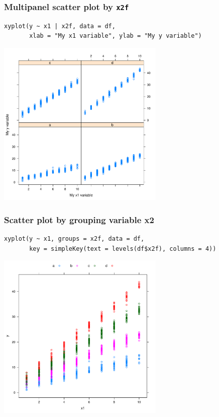 \documentclass[bigger]{beamer}
\begin{document}
\begin{frame}[fragile]
\frametitle{Multipanel scatter plot by \texttt{x2f}}
\label{sec-2_7}

\lstset{language=R}
\begin{lstlisting}
xyplot(y ~ x1 | x2f, data = df, 
       xlab = "My x1 variable", ylab = "My y variable")
\end{lstlisting}



\includegraphics[width=0.6\textwidth]{../graphs/lattice_scatter_cond.pdf}
\end{frame}
\begin{frame}[fragile,shrink = 10]
\frametitle{Scatter plot by grouping variable x2}
\label{sec-2_8}

\lstset{language=R}
\begin{lstlisting}
xyplot(y ~ x1, groups = x2f, data = df,
       key = simpleKey(text = levels(df$x2f), columns = 4))
\end{lstlisting}



\includegraphics[width=0.6\textwidth]{../graphs/lattice_scatter_g.pdf}
\end{frame}
\end{document}
